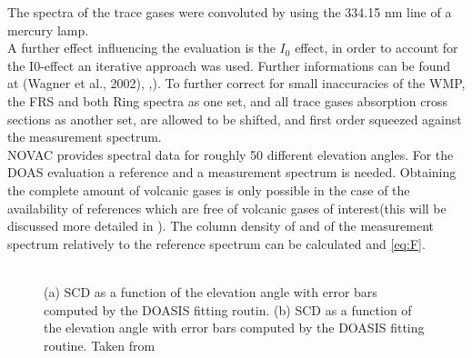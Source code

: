 The spectra of the trace gases were convoluted by using the 334.15 nm line of a mercury lamp.\\
A further effect influencing the evaluation is the $I_{0}$ effect, in order to account for the I0-effect \citep{platt2008differential} an
iterative approach was used. Further informations can be found at (Wagner et al., 2002), \cite{lubcke2014bro},\cite{vogel2011volcanic}).
To further correct for small inaccuracies of the WMP, the FRS and both Ring spectra as one set, and all trace gases absorption cross sections as another set, are allowed to be shifted, and first order squeezed against the measurement spectrum.\\
%
NOVAC provides spectral data for roughly 50 different elevation angles. For the DOAS evaluation a reference and a measurement spectrum is needed. Obtaining the complete amount of volcanic gases is only possible in the case of the availability of references which are free of volcanic gases of interest(this will be discussed more detailed in ). The column density of    and  of the measurement spectrum relatively to the reference spectrum can be calculated  and \ref{eq:F}. \\
\\
\begin{figure}
	\caption{(a)  SCD as a function of the elevation angle with error bars computed by the DOASIS fitting routin. (b)  SCD as a function of the elevation angle with error bars computed by the DOASIS fitting routine.  Taken from \cite{WarnachSimon}}
	\label{fig:plumeref}
\end{figure}
